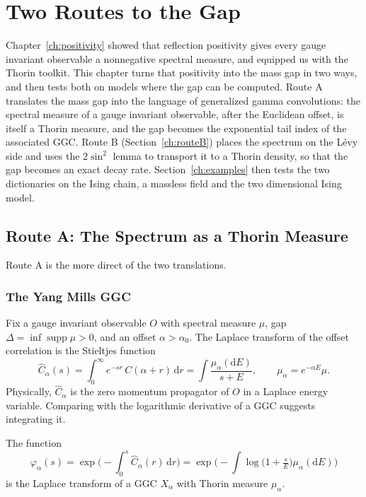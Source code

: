 \chapter{Two Routes to the Gap}\label{ch:routeA}

Chapter~\ref{ch:positivity} showed that reflection positivity gives every gauge invariant observable a nonnegative spectral measure, and equipped us with the Thorin toolkit. This chapter turns that positivity into the mass gap in two ways, and then tests both on models where the gap can be computed. Route A translates the mass gap into the language of generalized gamma convolutions\cite{Th77,Bo92}: the spectral measure of a gauge invariant observable, after the Euclidean offset, is itself a Thorin measure, and the gap becomes the exponential tail index of the associated GGC. Route B (Section~\ref{ch:routeB}) places the spectrum on the L\'evy side and uses the $2\sin^2$ lemma to transport it to a Thorin density, so that the gap becomes an exact decay rate. Section~\ref{ch:examples} then tests the two dictionaries on the Ising chain, a massless field and the two dimensional Ising model.

\section{Route A: The Spectrum as a Thorin Measure}\label{sec:routeAmain}

Route A is the more direct of the two translations.

\subsection{The Yang Mills GGC}

Fix a gauge invariant observable $O$ with spectral measure $\mu$, gap $\Delta=\inf\operatorname{supp}\mu>0$, and an offset $\alpha>\alpha_0$. The Laplace transform of the offset correlation is the Stieltjes function
\[
\widehat C_\alpha(s)=\int_0^\infty e^{-sr}\,C(\alpha+r)\,\mathrm dr=\int\frac{\mu_\alpha(\mathrm dE)}{s+E},\qquad \mu_\alpha=e^{-\alpha E}\mu .
\]
Physically, $\widehat C_\alpha$ is the zero momentum propagator of $O$ in a Laplace energy variable. Comparing with the logarithmic derivative of a GGC suggests integrating it.

\begin{proposition}\label{prop:ymggc}
The function
\[
\varphi_\alpha(s)=\exp\Big(-\int_0^s\widehat C_\alpha(r)\,\mathrm dr\Big)=\exp\Big(-\int\log\big(1+\tfrac sE\big)\mu_\alpha(\mathrm dE)\Big)
\]
is the Laplace transform of a GGC $X_\alpha$ with Thorin measure $\mu_\alpha$.
\end{proposition}

